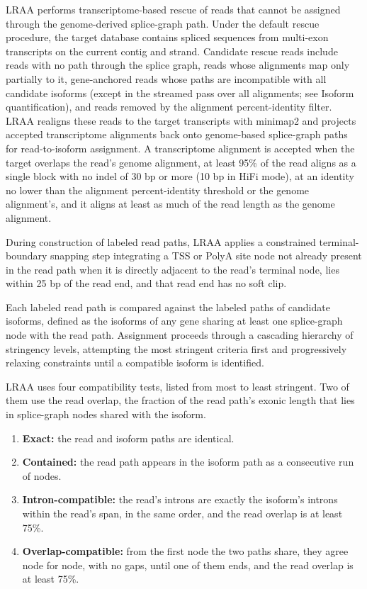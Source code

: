 LRAA performs transcriptome-based rescue of reads that cannot be assigned through the genome-derived splice-graph path. Under the default rescue procedure, the target database contains spliced sequences from multi-exon transcripts on the current contig and strand. Candidate rescue reads include reads with no path through the splice graph, reads whose alignments map only partially to it, gene-anchored reads whose paths are incompatible with all candidate isoforms (except in the streamed pass over all alignments; see Isoform quantification), and reads removed by the alignment percent-identity filter. LRAA realigns these reads to the target transcripts with minimap2 and projects accepted transcriptome alignments back onto genome-based splice-graph paths for read-to-isoform assignment. A transcriptome alignment is accepted when the target overlaps the read's genome alignment, at least 95\% of the read aligns as a single block with no indel of 30 bp or more (10 bp in HiFi mode), at an identity no lower than the alignment percent-identity threshold or the genome alignment's, and it aligns at least as much of the read length as the genome alignment.

During construction of labeled read paths, LRAA applies a constrained terminal-boundary snapping step integrating a TSS or PolyA site node not already present in the read path when it is directly adjacent to the read's terminal node, lies within 25 bp of the read end, and that read end has no soft clip. 

Each labeled read path is compared against the labeled paths of candidate isoforms, defined as the isoforms of any gene sharing at least one splice-graph node with the read path. Assignment proceeds through a cascading hierarchy of stringency levels, attempting the most stringent criteria first and progressively relaxing constraints until a compatible isoform is identified.

LRAA uses four compatibility tests, listed from most to least stringent. Two of them use the read overlap, the fraction of the read path's exonic length that lies in splice-graph nodes shared with the isoform.

\begin{enumerate}
\def\labelenumi{(\roman{enumi})}
\item
  \textbf{Exact:} the read and isoform paths are identical.
\item
  \textbf{Contained:} the read path appears in the isoform path as a consecutive run of nodes.
\item
  \textbf{Intron-compatible:} the read's introns are exactly the isoform's introns within the read's span, in the same order, and the read overlap is at least 75\%.
\item
  \textbf{Overlap-compatible:} from the first node the two paths share, they agree node for node, with no gaps, until one of them ends, and the read overlap is at least 75\%.
\end{enumerate}

